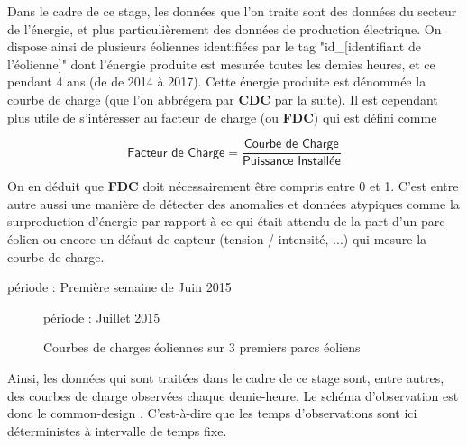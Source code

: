 
Dans le cadre de ce stage, les données que l'on traite sont des données du secteur de l'énergie, et plus particulièrement des données de production électrique. On dispose ainsi de plusieurs éoliennes identifiées par le tag "id\_[identifiant de l'éolienne]" dont l'énergie produite est mesurée toutes les demies heures, et ce pendant 4 ans (de de 2014 à 2017).
Cette énergie produite est dénommée la courbe de charge (que l'on abbrégera par \textbf{CDC} par la suite). Il est cependant plus utile de s'intéresser au facteur de charge (ou \textbf{FDC}) qui est défini comme

\begin{equation*}
\displaystyle\textsf{Facteur de Charge} = \frac{\textsf{Courbe de Charge}}{\textsf{Puissance Installée}}
\end{equation*}

On en déduit que \textbf{FDC} doit nécessairement être compris entre 0 et 1. C'est entre autre aussi une manière de détecter des anomalies et données atypiques comme la surproduction d'énergie par rapport à ce qui était attendu de la part d'un parc éolien ou encore un défaut de capteur (tension / intensité, ...) qui mesure la courbe de charge.



\begin{center}
	période : Première semaine de Juin 2015
	
\end{center}

\begin{figure}[H]
	\centering

	période : Juillet 2015

	\caption{Courbes de charges éoliennes sur 3 premiers parcs éoliens}
	\label{fig:courbes_de_charge}
\end{figure}

\bigskip

Ainsi, les données qui sont traitées dans le cadre de ce stage sont, entre autres, des courbes de charge observées chaque demie-heure. Le schéma d’observation est donc le \og common-design \fg. C'est-à-dire que les temps d'observations sont ici déterministes à intervalle de temps fixe.